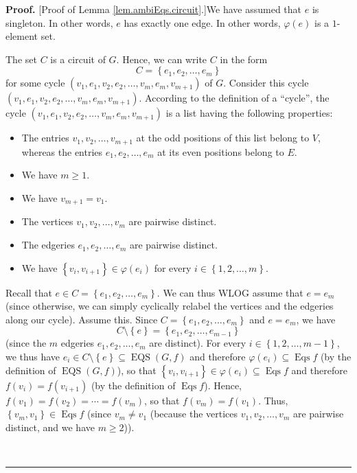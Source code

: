 \documentclass[numbers=enddot,12pt,final,onecolumn,notitlepage]{scrartcl}%
\theoremstyle{definition}
\newenvironment{proof}[1][Proof]{\noindent\textbf{#1.} }{\ \rule{0.5em}{0.5em}}
\newenvironment{vershort}{}{}
\begin{document}
\begin{vershort}
\begin{proof}
[Proof of Lemma \ref{lem.ambiEqs.circuit}.]We have assumed that $e$ is
singleton. In other words, $e$ has exactly one edge. In other words,
$\varphi\left(  e\right)  $ is a $1$-element set.

The set $C$ is a circuit of $G$. Hence, we can write $C$ in the form%
\[
C=\left\{  e_{1},e_{2},\ldots,e_{m}\right\}
\]
for some cycle $\left(  v_{1},e_{1},v_{2},e_{2},\ldots,v_{m},e_{m}%
,v_{m+1}\right)  $ of $G$. Consider this cycle \newline$\left(  v_{1}%
,e_{1},v_{2},e_{2},\ldots,v_{m},e_{m},v_{m+1}\right)  $. According to the
definition of a \textquotedblleft cycle\textquotedblright, the cycle $\left(
v_{1},e_{1},v_{2},e_{2},\ldots,v_{m},e_{m},v_{m+1}\right)  $ is a list having
the following properties:

\begin{itemize}
\item The entries $v_{1},v_{2},\ldots,v_{m+1}$ at the odd positions of this
list belong to $V$, whereas the entries $e_{1},e_{2},\ldots,e_{m}$ at its even
positions belong to $E$.

\item We have $m\geq1$.

\item We have $v_{m+1}=v_{1}$.

\item The vertices $v_{1},v_{2},\ldots,v_{m}$ are pairwise distinct.

\item The edgeries $e_{1},e_{2},\ldots,e_{m}$ are pairwise distinct.

\item We have $\left\{  v_{i},v_{i+1}\right\}  \in\varphi\left(  e_{i}\right)
$ for every $i\in\left\{  1,2,\ldots,m\right\}  $.
\end{itemize}

Recall that $e\in C=\left\{  e_{1},e_{2},\ldots,e_{m}\right\}  $. We can thus
WLOG assume that $e=e_{m}$ (since otherwise, we can simply cyclically relabel
the vertices and the edgeries along our cycle). Assume this. Since $C=\left\{
e_{1},e_{2},\ldots,e_{m}\right\}  $ and $e=e_{m}$, we have%
\[
C\setminus\left\{  e\right\}  =\left\{  e_{1},e_{2},\ldots,e_{m-1}\right\}
\]
(since the $m$ edgeries $e_{1},e_{2},\ldots,e_{m}$ are distinct). For every
$i\in\left\{  1,2,\ldots,m-1\right\}  $, we thus have $e_{i}\in C\setminus
\left\{  e\right\}  \subseteq\operatorname*{EQS}\left(  G,f\right)  $ and
therefore $\varphi\left(  e_{i}\right)  \subseteq\operatorname*{Eqs}f$ (by the
definition of $\operatorname*{EQS}\left(  G,f\right)  $), so that $\left\{
v_{i},v_{i+1}\right\}  \in\varphi\left(  e_{i}\right)  \subseteq
\operatorname*{Eqs}f$ and therefore $f\left(  v_{i}\right)  =f\left(
v_{i+1}\right)  $ (by the definition of $\operatorname*{Eqs}f$). Hence,
$f\left(  v_{1}\right)  =f\left(  v_{2}\right)  =\cdots=f\left(  v_{m}\right)
$, so that $f\left(  v_{m}\right)  =f\left(  v_{1}\right)  $. Thus, $\left\{
v_{m},v_{1}\right\}  \in\operatorname*{Eqs}f$ (since $v_{m}\neq v_{1}$
(because the vertices $v_{1},v_{2},\ldots,v_{m}$ are pairwise distinct, and we
have $m\geq2$)).


\end{proof}
\end{vershort}
\end{document}
